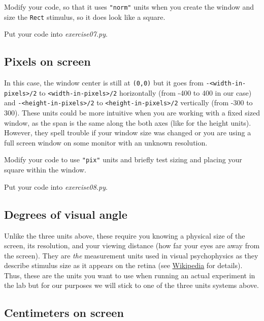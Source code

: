 \documentclass[
]{book}
\begin{document}
Modify your code, so that it uses \texttt{"norm"} units when you create the window and size the \texttt{Rect} stimulus, so it does look like a square.

Put your code into \emph{exercise07.py}.

\hypertarget{pixels-on-screen}{%
\subsection{Pixels on screen}\label{pixels-on-screen}}

In this case, the window center is still at \texttt{(0,0)} but it goes from \texttt{-\textless{}width-in-pixels\textgreater{}/2} to \texttt{\textless{}width-in-pixels\textgreater{}/2} horizontally (from -400 to 400 in our case) and \texttt{-\textless{}height-in-pixels\textgreater{}/2} to \texttt{\textless{}height-in-pixels\textgreater{}/2} vertically (from -300 to 300). These units could be more intuitive when you are working with a fixed sized window, as the span is the same along the both axes (like for the height units). However, they spell trouble if your window size was changed or you are using a full screen window on some monitor with an unknown resolution.

Modify your code to use \texttt{"pix"} units and briefly test sizing and placing your square within the window.

Put your code into \emph{exercise08.py}.

\hypertarget{degrees-of-visual-angle}{%
\subsection{Degrees of visual angle}\label{degrees-of-visual-angle}}

Unlike the three units above, these require you knowing a physical size of the screen, its resolution, and your viewing distance (how far your eyes are away from the screen). They are \emph{the} measurement units used in visual psychophysics as they describe stimulus size as it appears on the retina (see \href{https://en.wikipedia.org/wiki/Visual_angle}{Wikipedia} for details). Thus, these are the units you want to use when running an actual experiment in the lab but for our purposes we will stick to one of the three units systems above.

\hypertarget{centimeters-on-screen}{%
\subsection{Centimeters on screen}\label{centimeters-on-screen}}
\end{document}

